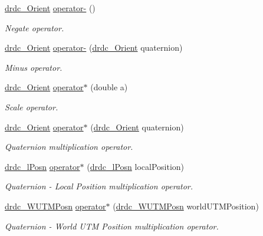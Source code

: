 \begin{CompactItemize}
\hyperlink{classdrdc__Orient}{drdc\_\-Orient} \hyperlink{classdrdc__Orient_13d30c34ec518ab7a2c817f270a83017}{operator-} ()
\begin{CompactList}\small\item\em Negate operator. \item\end{CompactList}\item 
\hyperlink{classdrdc__Orient}{drdc\_\-Orient} \hyperlink{classdrdc__Orient_6a5dcb219e6d37251bfa4565e6617555}{operator-} (\hyperlink{classdrdc__Orient}{drdc\_\-Orient} quaternion)
\begin{CompactList}\small\item\em Minus operator. \item\end{CompactList}\item 
\hyperlink{classdrdc__Orient}{drdc\_\-Orient} \hyperlink{classdrdc__Orient_b02e594d9602ffb25c705a85ac06e7e7}{operator$\ast$} (double a)
\begin{CompactList}\small\item\em Scale operator. \item\end{CompactList}\item 
\hyperlink{classdrdc__Orient}{drdc\_\-Orient} \hyperlink{classdrdc__Orient_44b796fac3437db7577aa159d25e5bff}{operator$\ast$} (\hyperlink{classdrdc__Orient}{drdc\_\-Orient} quaternion)
\begin{CompactList}\small\item\em Quaternion multiplication operator. \item\end{CompactList}\item 
\hyperlink{classdrdc__lPosn}{drdc\_\-lPosn} \hyperlink{classdrdc__Orient_229d6497cdf1bc758d5b865252f6e47e}{operator$\ast$} (\hyperlink{classdrdc__lPosn}{drdc\_\-lPosn} localPosition)
\begin{CompactList}\small\item\em Quaternion - Local Position multiplication operator. \item\end{CompactList}\item 
\hyperlink{classdrdc__WUTMPosn}{drdc\_\-WUTMPosn} \hyperlink{classdrdc__Orient_aaf289ae2f9164e2c4cae8e2df7e5bf4}{operator$\ast$} (\hyperlink{classdrdc__WUTMPosn}{drdc\_\-WUTMPosn} worldUTMPosition)
\begin{CompactList}\small\item\em Quaternion - World UTM Position multiplication operator. \item\end{CompactList}\item 

\end{CompactItemize}
